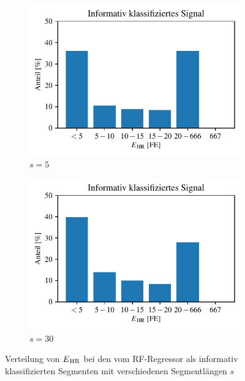  \begin{figure}[H]%
 	\centering
		\begin{subfigure}{.45\textwidth}
			\centering
 			\includegraphics[scale=0.7]{pic/rf-regr-s5-h20-positives.pdf}
 			\caption{$s=5$}
 		\end{subfigure}
    	\begin{subfigure}{.45\textwidth}
    		\centering
 			\includegraphics[scale=0.7]{pic/rf-regr-s30-h20-positives.pdf}
 			\caption{$s=30$}
 		\end{subfigure}
 	\caption{Verteilung von $E\textsubscript{HR}$ bei den vom \ac{RF}-Regressor als informativ klassifizierten Segmenten mit verschiedenen Segmentlängen $s$}
 	\label{fig:rf-regr-var-s-positives}
 \end{figure}

